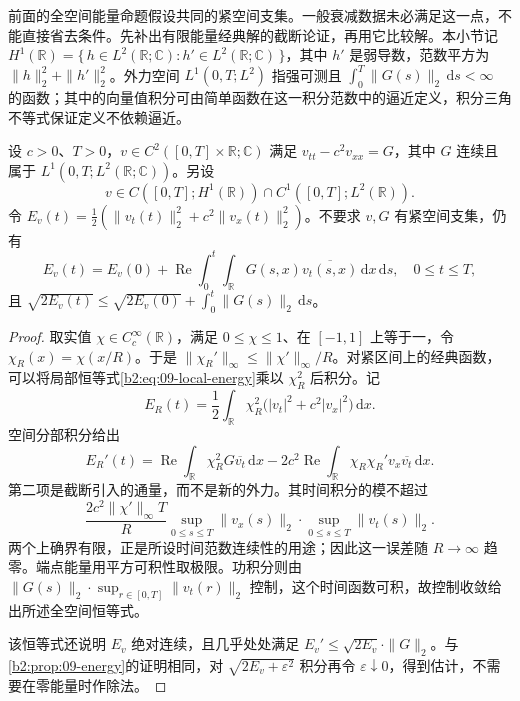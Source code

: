 前面的全空间能量命题假设共同的紧空间支集。一般衰减数据未必满足这一点，不能直接省去条件。先补出有限能量经典解的截断论证，再用它比较解。本小节记 \(H^1(\mathbb R)=\{\,h\in L^2(\mathbb R;\mathbb C):h'\in L^2(\mathbb R;\mathbb C)\,\}\)，其中 \(h'\) 是弱导数，范数平方为 \(\|h\|_2^2+\|h'\|_2^2\)。外力空间 \(L^1(0,T;L^2)\) 指强可测且 \(\int_0^T\|G(s)\|_2\,\mathrm{d}s<\infty\) 的函数；其中的向量值积分可由简单函数在这一积分范数中的逼近定义，积分三角不等式保证定义不依赖逼近。

\begin{lemma}[有限能量经典解的截断]\label{b2:lem:09-finite-energy-classical}
设 \(c>0\)、\(T>0\)，\(v\in C^2([0,T]\times\mathbb R;\mathbb C)\) 满足 \(v_{tt}-c^2v_{xx}=G\)，其中 \(G\) 连续且属于 \(L^1(0,T;L^2(\mathbb R;\mathbb C))\)。另设
\[
 v\in C([0,T];H^1(\mathbb R))\cap C^1([0,T];L^2(\mathbb R)).
\]
令 \(E_v(t)=\frac12(\|v_t(t)\|_2^2+c^2\|v_x(t)\|_2^2)\)。不要求 \(v,G\) 有紧空间支集，仍有
\[
 E_v(t)=E_v(0)+\operatorname{Re}\int_0^t\int_{\mathbb R}
 G(s,x)\overline{v_t(s,x)}\,\mathrm{d}x\,\mathrm{d}s,
\quad 0\leq t\leq T,
\]
且 \(\sqrt{2E_v(t)}\leq\sqrt{2E_v(0)}+\int_0^t\|G(s)\|_2\,\mathrm{d}s\)。
\end{lemma}
\begin{proof}
取实值 \(\chi\in C_c^\infty(\mathbb R)\)，满足 \(0\leq\chi\leq1\)、在 \([-1,1]\) 上等于一，令 \(\chi_R(x)=\chi(x/R)\)。于是 \(\|\chi_R'\|_\infty\leq\|\chi'\|_\infty/R\)。对紧区间上的经典函数，可以将局部恒等式\eqref{b2:eq:09-local-energy}乘以 \(\chi_R^2\) 后积分。记
\[
 E_R(t)=\frac12\int_{\mathbb R}\chi_R^2\bigl(|v_t|^2+c^2|v_x|^2\bigr)\,\mathrm{d}x.
\]
空间分部积分给出
\[
 E_R'(t)=\operatorname{Re}\int_{\mathbb R}\chi_R^2G\overline{v_t}\,\mathrm{d}x
 -2c^2\operatorname{Re}\int_{\mathbb R}\chi_R\chi_R'v_x\overline{v_t}\,\mathrm{d}x.
\]
第二项是截断引入的通量，而不是新的外力。其时间积分的模不超过
\[
 \frac{2c^2\|\chi'\|_\infty T}{R}
 \sup_{0\leq s\leq T}\|v_x(s)\|_2\cdot
 \sup_{0\leq s\leq T}\|v_t(s)\|_2.
\]
两个上确界有限，正是所设时间范数连续性的用途；因此这一误差随 \(R\to\infty\) 趋零。端点能量用平方可积性取极限。功积分则由 \(\|G(s)\|_2\cdot\sup_{r\in[0,T]}\|v_t(r)\|_2\) 控制，这个时间函数可积，故控制收敛给出所述全空间恒等式。

该恒等式还说明 \(E_v\) 绝对连续，且几乎处处满足 \(E_v'\leq\sqrt{2E_v}\cdot\|G\|_2\)。与\cref{b2:prop:09-energy}的证明相同，对 \(\sqrt{2E_v+\varepsilon^2}\) 积分再令 \(\varepsilon\downarrow0\)，得到估计，不需要在零能量时作除法。
\end{proof}

